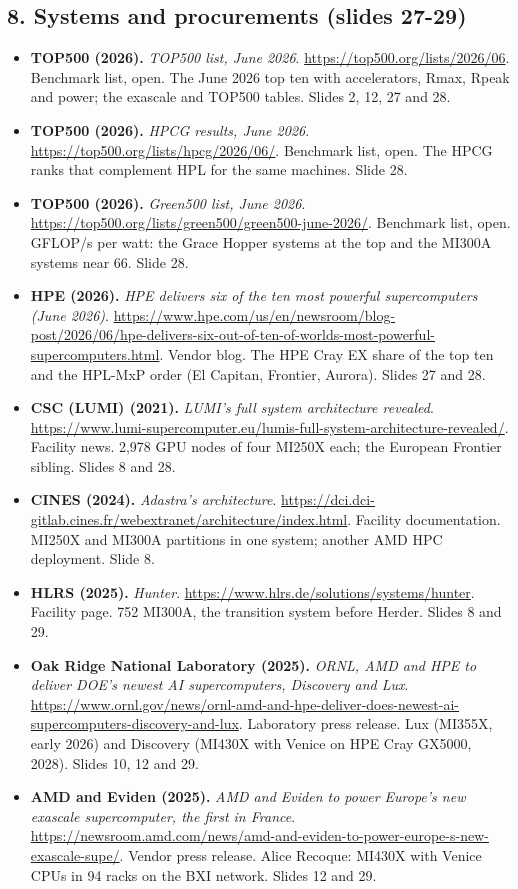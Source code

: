 \documentclass[11pt,letterpaper]{article}
\begin{document}
\subsection*{8. Systems and procurements (slides 27-29)}
\begin{itemize}[leftmargin=1.2em,itemsep=3pt]\sloppy
\item \textbf{TOP500 (2026).} \textit{TOP500 list, June 2026}. \url{https://top500.org/lists/2026/06}. Benchmark list, open. The June 2026 top ten with accelerators, Rmax, Rpeak and power; the exascale and TOP500 tables. Slides 2, 12, 27 and 28.
\item \textbf{TOP500 (2026).} \textit{HPCG results, June 2026}. \url{https://top500.org/lists/hpcg/2026/06/}. Benchmark list, open. The HPCG ranks that complement HPL for the same machines. Slide 28.
\item \textbf{TOP500 (2026).} \textit{Green500 list, June 2026}. \url{https://top500.org/lists/green500/green500-june-2026/}. Benchmark list, open. GFLOP/s per watt: the Grace Hopper systems at the top and the MI300A systems near 66. Slide 28.
\item \textbf{HPE (2026).} \textit{HPE delivers six of the ten most powerful supercomputers (June 2026)}. \url{https://www.hpe.com/us/en/newsroom/blog-post/2026/06/hpe-delivers-six-out-of-ten-of-worlds-most-powerful-supercomputers.html}. Vendor blog. The HPE Cray EX share of the top ten and the HPL-MxP order (El Capitan, Frontier, Aurora). Slides 27 and 28.
\item \textbf{CSC (LUMI) (2021).} \textit{LUMI's full system architecture revealed}. \url{https://www.lumi-supercomputer.eu/lumis-full-system-architecture-revealed/}. Facility news. 2,978 GPU nodes of four MI250X each; the European Frontier sibling. Slides 8 and 28.
\item \textbf{CINES (2024).} \textit{Adastra's architecture}. \url{https://dci.dci-gitlab.cines.fr/webextranet/architecture/index.html}. Facility documentation. MI250X and MI300A partitions in one system; another AMD HPC deployment. Slide 8.
\item \textbf{HLRS (2025).} \textit{Hunter}. \url{https://www.hlrs.de/solutions/systems/hunter}. Facility page. 752 MI300A, the transition system before Herder. Slides 8 and 29.
\item \textbf{Oak Ridge National Laboratory (2025).} \textit{ORNL, AMD and HPE to deliver DOE's newest AI supercomputers, Discovery and Lux}. \url{https://www.ornl.gov/news/ornl-amd-and-hpe-deliver-does-newest-ai-supercomputers-discovery-and-lux}. Laboratory press release. Lux (MI355X, early 2026) and Discovery (MI430X with Venice on HPE Cray GX5000, 2028). Slides 10, 12 and 29.
\item \textbf{AMD and Eviden (2025).} \textit{AMD and Eviden to power Europe's new exascale supercomputer, the first in France}. \url{https://newsroom.amd.com/news/amd-and-eviden-to-power-europe-s-new-exascale-supe/}. Vendor press release. Alice Recoque: MI430X with Venice CPUs in 94 racks on the BXI network. Slides 12 and 29.
\end{itemize}
\end{document}
